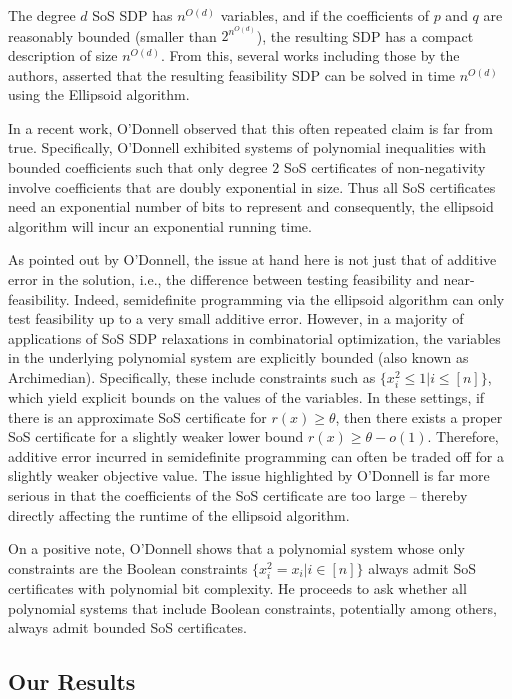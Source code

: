 \documentclass[a4paper,UKenglish]{lipics-v2016}
\begin{document}
The degree $d$ SoS SDP has $n^{O(d)}$ variables, and if the coefficients of $p$ and $q$ are reasonably bounded (smaller than $2^{n^{O(d)}}$), the resulting SDP has a compact description of size $n^{O(d)}$.
From this, several works including those by the authors, asserted that the resulting feasibility SDP can be solved in time $n^{O(d)}$ using the Ellipsoid algorithm.

In a recent work, O'Donnell \cite{odonnell17} observed that this often repeated claim is far from true.
Specifically, O'Donnell exhibited systems of polynomial inequalities with bounded coefficients such that only degree $2$ SoS certificates of non-negativity involve coefficients that are doubly exponential in size.
Thus all SoS certificates need an exponential number of bits to represent and consequently, the ellipsoid algorithm will incur an exponential running time.
 
As pointed out by O'Donnell, the issue at hand here is not just that of additive error in the solution, i.e., the difference between testing feasibility and near-feasibility.  
Indeed, semidefinite programming via the ellipsoid algorithm can only test feasibility up to a very small additive error.
However, in a majority of applications of SoS SDP relaxations in combinatorial optimization, the variables in the underlying polynomial system are explicitly bounded (also known as Archimedian).
Specifically, these include constraints such as $\{ x_i^2 \leq 1 | i \leq [n]\}$, which yield explicit bounds on the values of the variables.
In these settings, if there is an approximate SoS certificate for $r(x) \geq \theta$, then there exists a proper SoS certificate for a slightly weaker lower bound $r(x) \geq \theta - o(1)$.
Therefore, additive error incurred in semidefinite programming can often be traded off for a slightly weaker objective value.
The issue highlighted by O'Donnell is far more serious in that the coefficients of the SoS certificate are too large -- thereby directly affecting the runtime of the ellipsoid algorithm.

On a positive note, O'Donnell shows that a polynomial system whose only constraints are the Boolean constraints $\{x_i^2 = x_i | i \in [n]\}$ always admit SoS certificates with polynomial bit complexity.  
He proceeds to ask whether all polynomial systems that include Boolean constraints, potentially among others, always admit bounded SoS certificates.


\subsection{Our Results}
\end{document}
